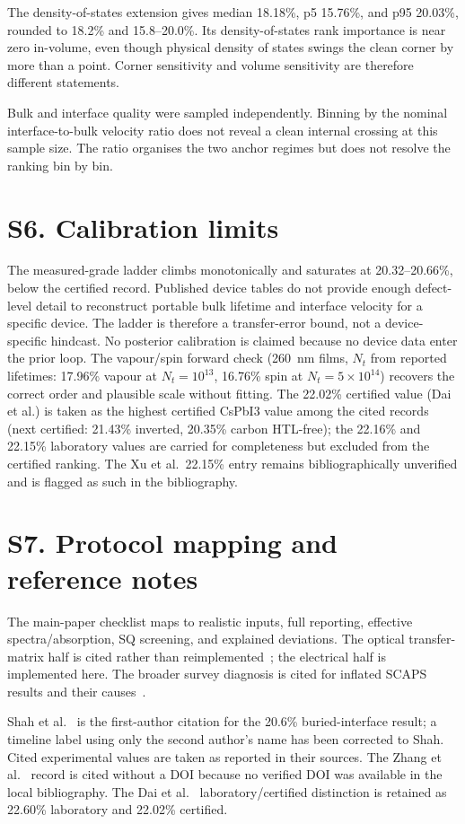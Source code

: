 \documentclass[11pt,a4paper]{article}
\begin{document}
The density-of-states extension gives median 18.18\%, p5 15.76\%, and p95 20.03\%, rounded to 18.2\% and 15.8--20.0\%. Its density-of-states rank importance is near zero in-volume, even though physical density of states swings the clean corner by more than a point. Corner sensitivity and volume sensitivity are therefore different statements.

Bulk and interface quality were sampled independently. Binning by the nominal interface-to-bulk velocity ratio does not reveal a clean internal crossing at this sample size. The ratio organises the two anchor regimes but does not resolve the ranking bin by bin.

\section*{S6. Calibration limits}

The measured-grade ladder climbs monotonically and saturates at 20.32--20.66\%, below the certified record. Published device tables do not provide enough defect-level detail to reconstruct portable bulk lifetime and interface velocity for a specific device. The ladder is therefore a transfer-error bound, not a device-specific hindcast. No posterior calibration is claimed because no device data enter the prior loop. The vapour/spin forward check (260~nm films, $N_t$ from reported lifetimes: 17.96\% vapour at $N_t=10^{13}$, 16.76\% spin at $N_t=5\times10^{14}$) recovers the correct order and plausible scale without fitting. The 22.02\% certified value (Dai et al.) is taken as the highest certified CsPbI3 value among the cited records (next certified: 21.43\% inverted, 20.35\% carbon HTL-free); the 22.16\% and 22.15\% laboratory values are carried for completeness but excluded from the certified ranking. The Xu et al.\ 22.15\% entry remains bibliographically unverified and is flagged as such in the bibliography.

\section*{S7. Protocol mapping and reference notes}

The main-paper checklist maps to realistic inputs, full reporting, effective spectra/absorption, SQ screening, and explained deviations. The optical transfer-matrix half is cited rather than reimplemented~\cite{Guruprasad2026}; the electrical half is implemented here. The broader survey diagnosis is cited for inflated SCAPS results and their causes~\cite{Saidarsan2025}.

Shah et al.~\cite{Shah2024} is the first-author citation for the 20.6\% buried-interface result; a timeline label using only the second author's name has been corrected to Shah. Cited experimental values are taken as reported in their sources. The Zhang et al.~\cite{Zhang2026} record is cited without a DOI because no verified DOI was available in the local bibliography. The Dai et al.~\cite{Dai2026} laboratory/certified distinction is retained as 22.60\% laboratory and 22.02\% certified.

\enlargethispage{12\baselineskip}


\end{document}
